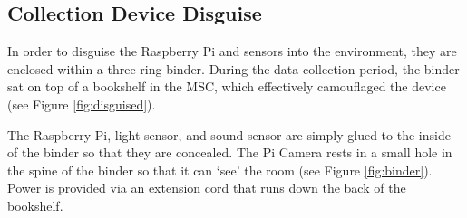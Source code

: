 \subsection{Collection Device Disguise}
In order to disguise the Raspberry Pi and sensors into the environment, they are enclosed within a three-ring binder. During the data collection period, the binder sat on top of a bookshelf in the MSC, which effectively camouflaged the device (see Figure \ref{fig:disguised}).

The Raspberry Pi, light sensor, and sound sensor are simply glued to the inside of the binder so that they are concealed. The Pi Camera rests in a small hole in the spine of the binder so that it can `see' the room (see Figure \ref{fig:binder}). Power is provided via an extension cord that runs down the back of the bookshelf.


